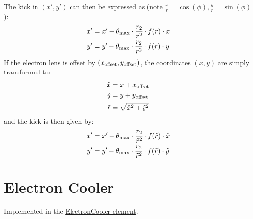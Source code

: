 The kick in $(x',y')$ can then be expressed as (note $\frac{x}{r}=\cos(\phi),\frac{y}{r}=\sin(\phi)$):
\begin{align}
x'&=x'-\theta_{\rm max}\cdot\frac{r_2}{r^2}\cdot f(r)\cdot x\\
y'&=y'-\theta_{\rm max}\cdot\frac{r_2}{r^2}\cdot f(r)\cdot y
\end{align}
If the electron lens is offset by $(x_{\rm offset},y_{\rm offset})$, the coordinates $(x,y)$ are simply transformed to:
\begin{align}
\tilde x&=x+x_{\rm offset}\\
\tilde y&=y+y_{\rm offset}\\
\tilde r&=\sqrt{\tilde x^2+\tilde y^2}
\end{align}
and the kick is then given by:
\begin{align}
x'&=x'-\theta_{\rm max}\cdot\frac{r_2}{\tilde r^2}\cdot f(\tilde r)\cdot \tilde x\\
y'&=y'-\theta_{\rm max}\cdot\frac{r_2}{\tilde r^2}\cdot f(\tilde r)\cdot \tilde y
\end{align}

\section{Electron Cooler}

Implemented in the \href{https://xsuite.readthedocs.io/en/latest/apireference.html#electroncooler}{\underline{ElectronCooler element}}.
~\\

